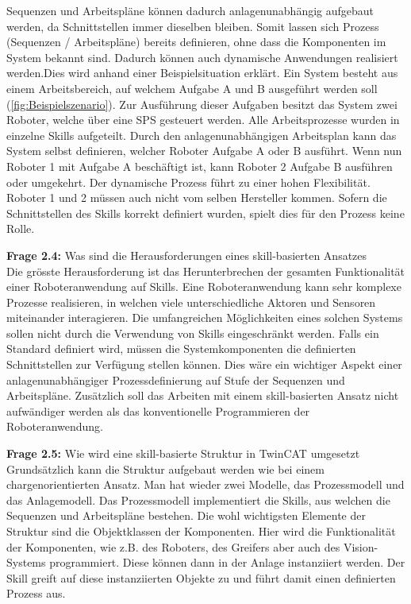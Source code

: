 		Sequenzen und Arbeitspläne können dadurch anlagenunabhängig aufgebaut werden, da Schnittstellen immer dieselben bleiben. Somit lassen sich Prozess (Sequenzen / Arbeitspläne) bereits definieren, ohne dass die Komponenten im System bekannt sind. Dadurch können auch dynamische Anwendungen realisiert werden.Dies wird anhand einer Beispielsituation erklärt. Ein System besteht aus einem Arbeitsbereich, auf welchem Aufgabe A und B ausgeführt werden soll (\ref{fig:Beispielszenario}).  
		Zur Ausführung dieser Aufgaben besitzt das System zwei Roboter, welche über eine SPS gesteuert werden. Alle Arbeitsprozesse wurden in einzelne Skills aufgeteilt. Durch den anlagenunabhängigen Arbeitsplan kann das System selbst definieren, welcher Roboter Aufgabe A oder B ausführt. Wenn nun Roboter 1 mit Aufgabe A beschäftigt ist, kann Roboter 2 Aufgabe B ausführen oder umgekehrt. Der dynamische Prozess führt zu einer hohen Flexibilität. Roboter 1 und 2 müssen auch nicht vom selben Hersteller kommen. Sofern die Schnittstellen des Skills korrekt definiert wurden, spielt dies für den Prozess keine Rolle. 
	
	\vspace{3mm}
	
	\textbf{Frage 2.4:} Was sind die Herausforderungen eines skill-basierten Ansatzes \vspace{2mm} 
	\\
		Die grösste Herausforderung ist das Herunterbrechen der gesamten Funktionalität einer Roboteranwendung auf Skills. Eine Roboteranwendung kann sehr komplexe Prozesse realisieren, in welchen viele unterschiedliche Aktoren und Sensoren miteinander interagieren. Die umfangreichen Möglichkeiten eines solchen Systems sollen nicht durch die Verwendung von Skills eingeschränkt werden. Falls ein Standard definiert wird, müssen die Systemkomponenten die definierten Schnittstellen zur Verfügung stellen können. Dies wäre ein wichtiger Aspekt einer anlagenunabhängiger Prozessdefinierung auf Stufe der Sequenzen und Arbeitspläne. Zusätzlich soll das Arbeiten mit einem skill-basierten Ansatz nicht aufwändiger werden als das konventionelle Programmieren der Roboteranwendung. 
	\vspace{3mm}
	
	\textbf{Frage 2.5:} Wie wird eine skill-basierte Struktur in TwinCAT umgesetzt \vspace{2mm} 
	\\
		Grundsätzlich kann die Struktur aufgebaut werden wie bei einem chargenorientierten Ansatz. Man hat wieder zwei Modelle, das Prozessmodell und das Anlagemodell. Das Prozessmodell implementiert die Skills, aus welchen die Sequenzen und Arbeitspläne bestehen. Die wohl wichtigsten Elemente der Struktur sind die Objektklassen der Komponenten. Hier wird die Funktionalität der Komponenten, wie z.B. des Roboters, des Greifers aber auch des Vision-Systems programmiert. Diese können dann in der Anlage instanziiert werden. Der Skill greift auf diese instanziierten Objekte zu und führt damit einen definierten Prozess aus. 
	
